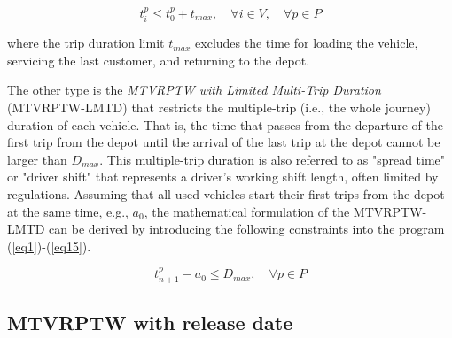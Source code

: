 \documentclass[11pt]{article}
\begin{document}
\begin{equation} \label{eq23}
    t^p_i \leq t^p_0 + t_{max}, \quad \forall i \in V, \quad \forall p \in P
\end{equation}

where the trip duration limit $t_{max}$ excludes the time for loading the vehicle, servicing the last customer, and returning to the depot.
\newline


The other type is the \textit{MTVRPTW with Limited Multi-Trip Duration} (MTVRPTW-LMTD) that restricts the multiple-trip (i.e., the whole journey) duration of each vehicle.  That is, the time that passes from the departure of the first trip from the depot until the arrival of the last trip at the depot cannot be larger than $D_{max}$.  This multiple-trip duration is also referred to as "spread time" \citep[e.g.,][]{battarra2009adaptive, wang2014metaheuristic, karoonsoontawong2015efficient, cattaruzza2016vehicle} or "driver shift" \citep[e.g.,][]{franccois2019adaptive} that represents a driver's working shift length, often limited by regulations.  Assuming that all used vehicles start their first trips from the depot at the same time, e.g., $a_0$, the mathematical formulation of the MTVRPTW-LMTD can be derived by introducing the following constraints into the program (\ref{eq1})-(\ref{eq15}).

\begin{equation} \label{eq24}
    t^p_{n+1} - a_0 \leq D_{max}, \quad \forall p \in P
\end{equation}

\subsection{MTVRPTW with release date}
\end{document}
